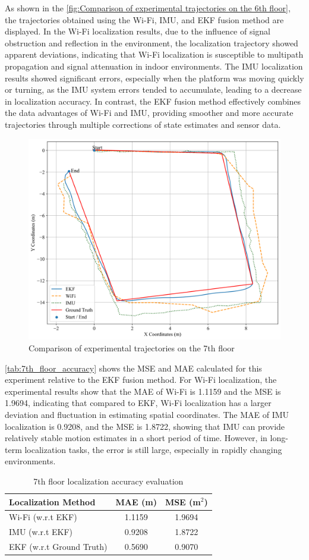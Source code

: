 \documentclass[12pt,a4paper]{article}
\numberwithin{equation}{section}
\begin{document}
As shown in the \autoref{fig:Comparison of experimental trajectories on the 6th floor}, the trajectories obtained using the Wi-Fi, IMU, and EKF fusion method are displayed. In the Wi-Fi localization results, due to the influence of signal obstruction and reflection in the environment, the localization trajectory showed apparent deviations, indicating that Wi-Fi localization is susceptible to multipath propagation and signal attenuation in indoor environments. The IMU localization results showed significant errors, especially when the platform was moving quickly or turning, as the IMU system errors tended to accumulate, leading to a decrease in localization accuracy. In contrast, the EKF fusion method effectively combines the data advantages of Wi-Fi and IMU, providing smoother and more accurate trajectories through multiple corrections of state estimates and sensor data.
\begin{figure}[H]
    \centering
    \includegraphics[width=0.7\linewidth]{images/1/2.png}
    \caption{Comparison of experimental trajectories on the 7th floor}
    \label{fig:Comparison of experimental trajectories on the 6th floor}
\end{figure}
\noindent \autoref{tab:7th_floor_accuracy} shows the MSE and MAE calculated for this experiment relative to the EKF fusion method. For Wi-Fi localization, the experimental results show that the MAE of Wi-Fi is 1.1159 and the MSE is 1.9694, indicating that compared to EKF, Wi-Fi localization has a larger deviation and fluctuation in estimating spatial coordinates. The MAE of IMU localization is 0.9208, and the MSE is 1.8722, showing that IMU can provide relatively stable motion estimates in a short period of time. However, in long-term localization tasks, the error is still large, especially in rapidly changing environments.
\begin{table}[H]
\centering
\caption{7th floor localization accuracy evaluation}
\label{tab:7th_floor_accuracy}
\begin{tabular}{lcc}
\toprule
\textbf{Localization Method} & \textbf{MAE (m)} & \textbf{MSE (m$^2$)} \\
\midrule
Wi-Fi (w.r.t EKF) & 1.1159 & 1.9694 \\
IMU (w.r.t EKF)   & 0.9208 & 1.8722 \\
EKF (w.r.t Ground Truth)    & 0.5690 & 0.9070 \\
\bottomrule
\end{tabular}
\end{table}
\end{document}
